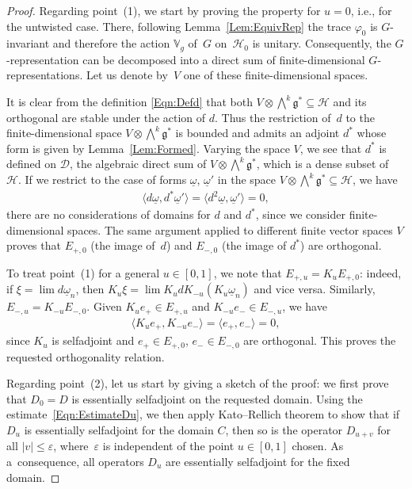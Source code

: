 \documentclass[pdftex]{sigma}
\newcommand{\Core}{C}
\newcommand{\Dd}{\mathscr{D}}
\newcommand{\Hh}{\mathscr{H}}
\newcommand{\LieG}{\mathfrak{g}}
\newcommand{\omegat}{\underline{\omega}}
\newcommand{\RepV}{\mathbb{V}}
\numberwithin{equation}{section}
\begin{document}
\begin{proof}
Regarding point~(1), %
we start by proving the property for $u = 0$, i.e., for the untwisted case. There, following Lemma~\ref{Lem:EquivRep} the trace $\varphi_0$ is $G$-invariant and therefore the action $\RepV_g$ of~$G$ on~$\Hh_0$ is unitary. Consequently, the $G$-representation can be decomposed into a direct sum of f\/inite-dimensional $G$-representations. Let us denote by~$V$ one of these f\/inite-dimensional spaces.

It is clear from the def\/inition \eqref{Eqn:Defd} that both $V \otimes \bigwedge^k \LieG^* \subseteq \Hh$ and its orthogonal are stable under the action of $d$. Thus the restriction of~$d$ to the f\/inite-dimensional space $V \otimes \bigwedge^k \LieG^*$ is bounded and admits an adjoint $d^*$ whose form is given by Lemma~\ref{Lem:Formed}. Varying the space $V$, we see that $d^*$ is def\/ined on $\Dd$, the algebraic direct sum of $V \otimes \bigwedge^k \LieG^*$, which is a dense subset of~$\Hh$. If we restrict to the case of forms $\omegat$, $\omegat'$ in the space $V \otimes \bigwedge^k \LieG^* \subseteq \Hh$, we have
\begin{gather*}
\langle d \omegat, d^* \omegat' \rangle = \langle d^2 \omegat, \omegat' \rangle = 0,
\end{gather*}
there are no considerations of domains for $d$ and $d^*$, since we consider f\/inite-dimensional spaces. The same argument applied to dif\/ferent f\/inite vector spaces $V$ proves that $E_{+,0}$ (the image of~$d$) and $E_{-,0}$ (the image of $d^*$) are orthogonal.

To treat point~(1) %
for a general $u \in [0,1]$, we note that $E_{+,u} = K_u E_{+,0}$: indeed, if $\xi = \lim d \omegat_n$, then $K_u \xi = \lim K_u d K_{-u} (K_u \omegat_n)$ and vice versa. Similarly, $E_{-,u} = K_{-u} E_{-,0}$. Given $K_u e_+ \in E_{+,u}$ and $K_{-u} e_- \in E_{-,u}$, we have
\begin{gather*}
\langle K_u e_+, K_{-u} e_- \rangle = \langle e_+, e_- \rangle = 0,
\end{gather*}
since $K_u$ is selfadjoint and $e_+ \in E_{+,0}$, $e_- \in E_{-,0}$ are orthogonal. This proves the requested orthogonality relation.

Regarding point~(2), %
let us start by giving a sketch of the proof: we f\/irst prove that $D_0 = D$ is essentially selfadjoint on the requested domain. Using the estimate~\eqref{Eqn:EstimateDu}, we then apply Kato--Rellich theorem to show that if $D_{u}$ is essentially selfadjoint for the domain $\Core$, then so is the operator $D_{u + v}$ for all $|v| \leqslant \varepsilon$, where~$\varepsilon$ is independent of the point $u \in [0,1]$ chosen. As a~consequence, all operators $D_u$ are essentially selfadjoint for the f\/ixed domain.


\end{proof}
\end{document}
